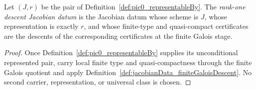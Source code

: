 \begin{definition}
  \label{def:jacobianData}
  \notready
  Let \((J,r)\) be the pair of
  Definition~\ref{def:pic0_representableBy}.  The \emph{rank-one descent Jacobian datum} is
  the Jacobian datum whose scheme is \(J\), whose representation is exactly \(r\), and whose
  finite-type and quasi-compact certificates are the descents of the corresponding
  certificates at the finite Galois stage.
\end{definition}
\begin{proof}
  Once Definition~\ref{def:pic0_representableBy} supplies its unconditional represented pair,
  carry local finite type and quasi-compactness through the finite Galois quotient and apply
  Definition~\ref{def:jacobianData_finiteGaloisDescent}.  No second carrier, representation,
  or universal class is chosen.
\end{proof}
